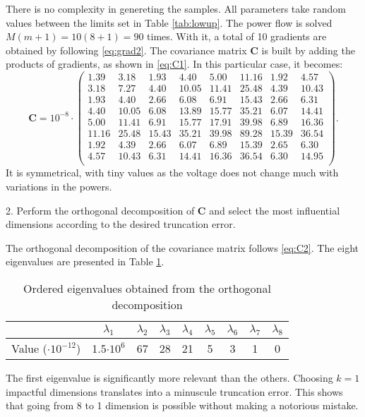 There is no complexity in genereting the samples. All parameters take random values between the limits set in Table \ref{tab:lowup}. The power flow is solved $M(m+1) = 10(8 + 1)=90$ times. With it, a total of 10 gradients are obtained by following \eqref{eq:grad2}. The covariance matrix $\mathbf{C}$ is built by adding the products of gradients, as shown in \eqref{eq:C1}. In this particular case, it becomes:
\begin{equation}
  \mathbf{C} = 10^{-8} \cdot \begin{pmatrix}
 1.39 & 3.18 &  1.93 & 4.40 & 5.00 &  11.16 & 1.92 & 4.57 \\
 3.18 & 7.27 &  4.40 &  10.05 & 11.41 &25.48 & 4.39 & 10.43 \\
 1.93 & 4.40 &   2.66 & 6.08 & 6.91 &  15.43 & 2.66 & 6.31 \\
 4.40 & 10.05 & 6.08 & 13.89 & 15.77 &  35.21 & 6.07 & 14.41 \\
 5.00 & 11.41 & 6.91 & 15.77 & 17.91 & 39.98 & 6.89 &  16.36 \\ 
 11.16 &25.48 & 15.43 &35.21 &39.98 & 89.28 &  15.39 &36.54 \\
 1.92 & 4.39 &  2.66 & 6.07 & 6.89 &   15.39 & 2.65 & 6.30 \\
 4.57 &  10.43 & 6.31 & 14.41 & 16.36 & 36.54 & 6.30 & 14.95 \\
  \end{pmatrix}.
  \label{eq:Cres}
\end{equation}
It is symmetrical, with tiny values as the voltage does not change much with variations in the powers.

\hspace{0.32cm} 2. Perform the orthogonal decomposition of $\mathbf{C}$ and select the most influential dimensions according to the desired truncation error. 

The orthogonal decomposition of the covariance matrix follows \eqref{eq:C2}. The eight eigenvalues are presented in Table \ref{tab:eigenv}. 

\begin{table}[!htb]
  \centering
  \begin{tabular}{lcccccccc}
    \hline
     & $\lambda_1$ & $\lambda_2$ & $\lambda_3$ & $\lambda_4$ & $\lambda_5$ & $\lambda_6$ & $\lambda_7$ & $\lambda_8$ \\
    \hline
    Value ($\cdot 10^{-12}$) & 1.5$\cdot 10^{6}$ & 67 & 28 & 21 & 5 & 3 & 1 & 0 \\
    \hline
  \end{tabular}
  \caption{Ordered eigenvalues obtained from the orthogonal decomposition}
  \label{tab:eigenv}
\end{table}
The first eigenvalue is significantly more relevant than the others. Choosing $k=1$ impactful dimensions translates into a minuscule truncation error. This shows that going from 8 to 1 dimension is possible without making a notorious mistake. 

